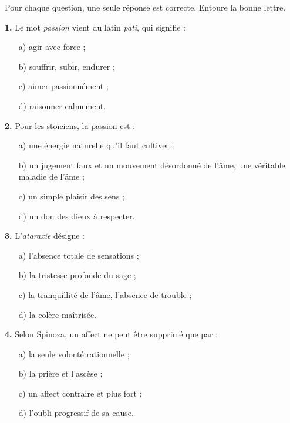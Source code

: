 \documentclass[11pt]{article}
\begin{document}
\begin{exercice}
Pour chaque question, une seule réponse est correcte. Entoure la bonne lettre.

\textbf{1.} Le mot \emph{passion} vient du latin \emph{pati}, qui signifie :
\begin{itemize}
\item[a)] agir avec force ;
\item[b)] souffrir, subir, endurer ;
\item[c)] aimer passionnément ;
\item[d)] raisonner calmement.
\end{itemize}

\textbf{2.} Pour les stoïciens, la passion est :
\begin{itemize}
\item[a)] une énergie naturelle qu'il faut cultiver ;
\item[b)] un jugement faux et un mouvement désordonné de l'âme, une véritable maladie de l'âme ;
\item[c)] un simple plaisir des sens ;
\item[d)] un don des dieux à respecter.
\end{itemize}

\textbf{3.} L'\emph{ataraxie} désigne :
\begin{itemize}
\item[a)] l'absence totale de sensations ;
\item[b)] la tristesse profonde du sage ;
\item[c)] la tranquillité de l'âme, l'absence de trouble ;
\item[d)] la colère maîtrisée.
\end{itemize}

\textbf{4.} Selon Spinoza, un affect ne peut être supprimé que par :
\begin{itemize}
\item[a)] la seule volonté rationnelle ;
\item[b)] la prière et l'ascèse ;
\item[c)] un affect contraire et plus fort ;
\item[d)] l'oubli progressif de sa cause.
\end{itemize}
\end{exercice}
\end{document}
